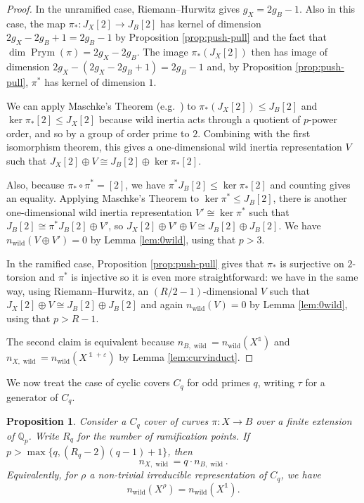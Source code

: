 \documentclass[12pt]{amsart}
\newtheorem{proposition}[theorem]{Proposition}
\theoremstyle{definition}
\theoremstyle{remark}
\newcommand{\eps}{\varepsilon}
\newcommand{\QQ}{\mathbb{Q}}
\DeclareMathOperator{\Prym}{Prym}
\DeclareMathOperator{\wild}{wild}
\DeclareMathOperator{\one}{\mathds{1}}
\begin{document}
\begin{proof}
    In the unramified case, Riemann--Hurwitz gives $g_X=2g_B-1$. Also in this case, the map $\pi_*:J_X[2]\to J_B[2]$ has kernel of dimension $2g_X-2g_B+1=2g_B-1$ by Proposition \ref{prop:push-pull} and the fact that $\dim\Prym(\pi)=2g_X-2g_B$. The image $\pi_*(J_X[2])$ then has image of dimension $2g_X-(2g_X-2g_B+1)=2g_B-1$ and, by Proposition \ref{prop:push-pull}, $\pi^*$ has kernel of dimension $1$.
    
    We can apply Maschke's Theorem (e.g.\ \cite[Theorem 1]{SerreReps}) to $\pi_*(J_X[2])\le J_B[2]$ and $\ker\pi_*[2]\le J_X[2]$ because wild inertia acts through a quotient of $p$-power order, and so by a group of order prime to $2$. Combining with the first isomorphism theorem, this gives a one-dimensional wild inertia representation $V$ such that $J_X[2]\oplus V\cong J_B[2]\oplus \ker\pi_*[2]$.

    Also, because $\pi_*\circ\pi^*=[2]$, we have $\pi^*J_B[2]\le \ker\pi_*[2]$ and counting gives an equality. Applying Maschke's Theorem to $\ker\pi^*\le J_B[2]$, there is another one-dimensional wild inertia representation $V'\cong\ker\pi^*$ such that $J_B[2]\cong\pi^*J_B[2]\oplus V'$, so $J_X[2]\oplus V'\oplus V \cong J_B[2]\oplus J_B[2]$. We have $n_{\wild}(V\oplus V')=0$ by Lemma \ref{lem:0wild}, using that $p>3$.

    In the ramified case, Proposition \ref{prop:push-pull} gives that $\pi_*$ is surjective on $2$-torsion and $\pi^*$ is injective so it is even more straightforward: we have in the same way, using Riemann--Hurwitz, an $(R/2-1)$-dimensional $V$ such that $J_X[2]\oplus V \cong J_B[2]\oplus J_B[2]$ and again $n_{\wild}(V)=0$ by Lemma \ref{lem:0wild}, using that $p>R-1$.
    
    The second claim is equivalent because $n_{B,\wild}=n_{\wild}(X^{\one})$ and $n_{X,\wild}=n_{\wild}(X^{\one+\eps})$ by Lemma \ref{lem:curvinduct}.
\end{proof}

We now treat the case of cyclic covers $C_q$ for odd primes $q$, writing $\tau$ for a generator of $C_q$.
 
\begin{proposition}\label{prop:Cq_main}
    Consider a $C_q$ cover of curves $\pi: X\to B$ over a finite extension of $\QQ_p$. Write $R_q$ for the number of ramification points. If $p>\max\{q,(R_q-2)(q-1)+1\}$, then
    \[n_{X,\wild}=q\cdot n_{B,\wild}.\]
    Equivalently, for $\rho$ a non-trivial irreducible representation of $C_q$, we have
    \[ n_{\wild}(X^\rho)=n_{\wild}(X^{\one}). \]
\end{proposition}
\end{document}
